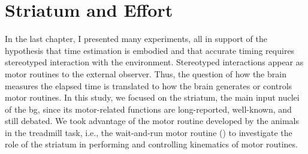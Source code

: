 \chapter{Striatum and Effort} \label{ch:lesion}
In the last chapter, I presented many experiments, all in support of the hypothesis that time estimation is embodied and that accurate timing requires stereotyped interaction with the environment.
Stereotyped interactions appear as motor routines to the external observer.
Thus, the question of how the brain measures the elapsed time is translated to how the brain generates or controls motor routines.
In this study, we focused on the striatum, the main input nuclei of the \gls{bg}, since its motor-related functions are long-reported, well-known, and still debated.\footnotemark
We took advantage of the motor routine developed by the animals in the treadmill task, i.e., the wait-and-run motor routine () to investigate the role of the striatum in performing and controlling kinematics of motor routines.

